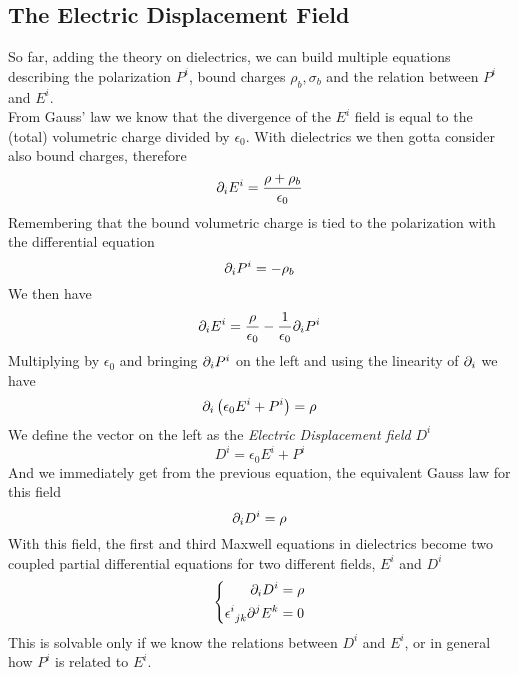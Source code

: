 \documentclass[../electromagnetism]{subfiles}
\begin{document}
\subsection{The Electric Displacement Field}
So far, adding the theory on dielectrics, we can build multiple equations describing the polarization $P^i$, bound charges $\rho_b,\sigma_b$ and the relation between $P^i$ and $E^i$.\\
From Gauss' law we know that the divergence of the $E^i$ field is equal to the (total) volumetric charge divided by $\epsilon_0$. With dielectrics we then gotta consider also bound charges, therefore
\begin{equation*}
	\partial_iE^i=\frac{\rho+\rho_b}{\epsilon_0}
\end{equation*}
Remembering that the bound volumetric charge is tied to the polarization with the differential equation
\begin{equation*}
	\partial_iP^i=-\rho_b
\end{equation*}
We then have
\begin{equation*}
	\partial_iE^i=\frac{\rho}{\epsilon_0}-\frac{1}{\epsilon_0}\partial_iP^i
\end{equation*}
Multiplying by $\epsilon_0$ and bringing $\partial_iP^i$ on the left and using the linearity of $\partial_i$ we have
\begin{equation*}
	\partial_i\left( \epsilon_0E^i+P^i \right)=\rho
\end{equation*}
We define the vector on the left as the \textit{Electric Displacement field} $D^i$
\begin{equation}
	D^i=\epsilon_0E^i+P^i
	\label{eq:electricdisplacement}
\end{equation}
And we immediately get from the previous equation, the equivalent Gauss law for this field
\begin{equation}
	\partial_iD^i=\rho
	\label{eq:dispfieldgauss}
\end{equation}
With this field, the first and third Maxwell equations in dielectrics become two coupled partial differential equations for two different fields, $E^i$ and $D^i$
\begin{equation}
	\left\{ \begin{aligned}
		\partial_iD^i&=\rho\\
		\epsilon^{i}_{\ jk}\partial^jE^k&=0
\end{aligned}\right.
	\label{eq:mwdie}
\end{equation}
This is solvable only if we know the relations between $D^i$ and $E^i$, or in general how $P^i$ is related to $E^i$.\\
\end{document}
